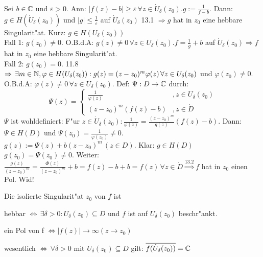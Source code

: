 \documentclass[a4paper,twoside,DIV15,BCOR12mm]{scrbook}
\begin{document}
\begin{beweis}
Sei $b \in \mathbb{C}$ und $\varepsilon > 0.$ Ann: $|f(z) - b | \geq \varepsilon \, \forall z \in \dot{U}_{\delta}(z_0). g:= \frac1{f-b}.$ Dann: $g \in H(\dot{U}_{\delta}(z_0))$ und $|g| \leq \frac1{\varepsilon}$ auf $\dot{U}_{\delta}(z_0)$ 13.1 $\Rightarrow g$ hat in $z_0$ eine hebbare Singularit"at. Kurz: $g \in H (U_{\delta}(z_0))$\\
Fall 1: $g(z_0) \not= 0.$ O.B.d.A: $g(z) \not= 0 \, \forall z \in U_{\delta}(z_0). f = \frac1g+b$ auf $\dot{U}_{\delta}(z_0) \Rightarrow f$ hat in $z_0$ eine hebbare Singularit"at.\\
Fall 2: $g(z_0) = 0.$ 11.8 $\Rightarrow \, \exists m \in \mathbb{N}, \varphi \in H(U_{\delta}(z_0)): g(z) = (z-z_0)^m \varphi(z) \, \forall z \in U_{\delta}(z_0)$ und $\varphi(z_0) \not= 0$. O.B.d.A: $\varphi(z) \not= 0 \, \forall z \in U_{\delta}(z_0).$ Def: $\Psi: D \rightarrow \mathbb{C}$ durch:
\[
\Psi(z) = \begin{cases}
\frac1{\varphi(z)} &, z \in U_{\delta}(z_0)\\
(z-z_0)^m(f(z)-b) &,z \in \dot{D}
\end{cases}
\]
$\Psi$ ist wohldefiniert: F"ur $z \in \dot{U}_{\delta}(z_0): \frac1{\varphi(z)} = \frac{(z-z_0)^m}{g(z)}(f(z)-b)$.
Dann: $\Psi \in H(D)$ und $\Psi(z_0) = \frac1{\varphi(z_0)} \not= 0.$\\
$g(z) := \Psi(z) + b(z-z_0)^m \, (z \in D).$ Klar: $g \in H(D)$\\
$g(z_0) = \Psi(z_0) \not= 0$.
Weiter: $\frac{g(z)}{(z-z_0)^m} = \frac{\Phi(z)}{(z-z_0)^m}+b = f(z) - b + b = f(z) \, \forall z \in \dot{D} \stackrel{13.2}{\Rightarrow} f$ hat in $z_0$ einen Pol. Wid!
\end{beweis}

\begin{satz}[Klassifikation]
Die isolierte Singularit"at $z_0$ von $f$ ist
\begin{liste}
\item hebbar $\Leftrightarrow \, \exists \delta > 0 : U_{\delta}(z_0) \subseteq D$ und $f$ ist auf $U_{\delta}(z_0)$ beschr"ankt.
\item ein Pol von f $\Leftrightarrow |f(z)| \rightarrow \infty (z \rightarrow z_0)$
\item wesentlich $\Leftrightarrow \, \forall \delta > 0$ mit $U_{\delta}(z_0) \subseteq D$ gilt: $\overline{f(\dot{U}_{\delta}(z_0))} = \mathbb{C}$
\end{liste}
\end{satz}
\end{document}
